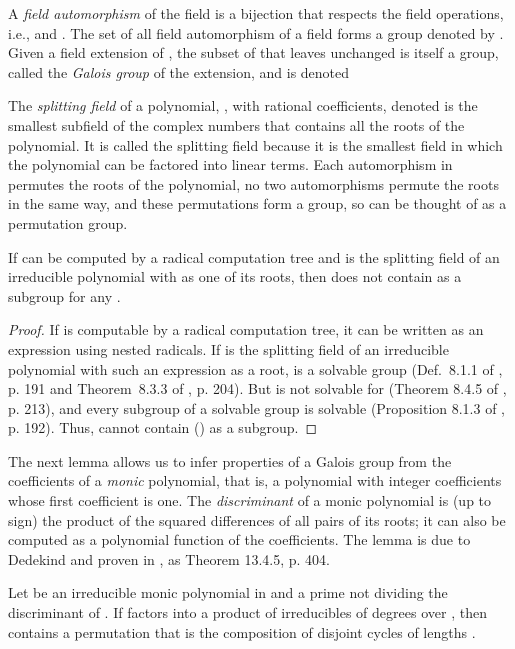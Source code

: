 \documentclass[oribibl,10pt]{llncs}
\begin{document}
A \emph{field automorphism} of the field  is a bijection  that respects the field operations, i.e.,  and . The set of all field automorphism of a field  forms a group denoted by . Given a field extension  of , the subset of  that leaves  unchanged is itself a group, called the \emph{Galois group} of the extension, and is denoted

The \emph{splitting field} of a polynomial, , with rational coefficients, denoted  is the smallest subfield of the complex numbers that contains  all the roots of the polynomial. 
\ifFull
It is called the splitting field because it is the smallest field in which the polynomial can be factored into linear terms.
\fi
Each automorphism in  permutes the roots of the polynomial, no two automorphisms permute the roots in the same way, and these permutations form a group, so  can be thought of as a permutation group.

\begin{lemma}\label{lem:radical-tree}
If  can be computed by a radical computation tree and  is the splitting field of an irreducible polynomial with  as one of its roots, then  does not contain  as a subgroup for any .
\end{lemma}
\begin{proof}
If  is computable by a radical computation tree, it can be written as an expression using nested radicals. If  is the splitting field of an irreducible polynomial with such an expression as a root,  is a solvable group (Def.~8.1.1 of \cite{Cox2012}, p. 191 and Theorem~8.3.3 of \cite{Cox2012}, p. 204). But  is not solvable for  (Theorem 8.4.5 of \cite{Cox2012}, p. 213), and every subgroup of a solvable group is solvable (Proposition 8.1.3 of \cite{Cox2012}, p. 192). Thus,  cannot contain  () as a subgroup.\end{proof}

The next lemma allows us to infer properties of a Galois group from the coefficients of a \emph{monic} polynomial, that is, a polynomial with integer coefficients whose first coefficient is one. The \emph{discriminant} of a monic polynomial is (up to sign) the product of the squared differences of all pairs of its roots; it can also be computed as a polynomial function of the coefficients. The lemma is due to Dedekind and proven in \cite{Cox2012}\ifFull, as Theorem 13.4.5, p. 404\fi.

\begin{lemma}
Let  be an irreducible monic polynomial in  and  a prime not dividing the discriminant of . If  factors into a product of irreducibles of degrees  over , then  contains a permutation that is the composition of disjoint cycles of lengths .
\end{lemma}
\end{document}
